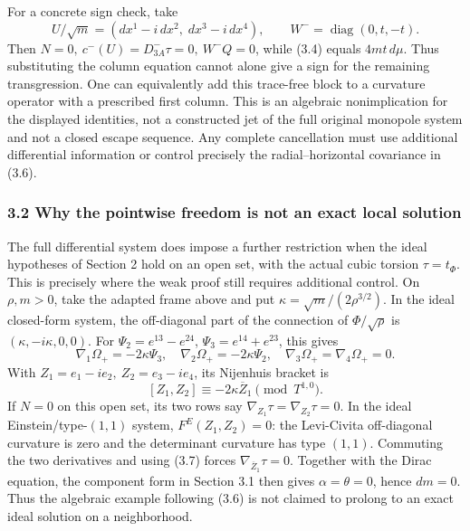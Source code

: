 \documentclass[
  10pt,
]{article}
\begin{document}
For a concrete sign check, take \[
 U/\sqrt m=(dx^1-i\,dx^2,\;dx^3-i\,dx^4),\qquad
 W^-=\operatorname{diag}(0,t,-t).
\] Then \(N=0,\ c^-(U)=D^-_{3A}\tau=0,\ W^-Q=0\), while (3.4) equals
\(4mt\,d\mu\). Thus substituting the column equation cannot alone give a
sign for the remaining transgression. One can equivalently add this
trace-free block to a curvature operator with a prescribed first column.
This is an algebraic nonimplication for the displayed identities, not a
constructed jet of the full original monopole system and not a closed
escape sequence. Any complete cancellation must use additional
differential information or control precisely the radial--horizontal
covariance in (3.6).

\hypertarget{why-the-pointwise-freedom-is-not-an-exact-local-solution}{%
\subsubsection{3.2 Why the pointwise freedom is not an exact local
solution}\label{why-the-pointwise-freedom-is-not-an-exact-local-solution}}

The full differential system does impose a further restriction when the
ideal hypotheses of Section 2 hold on an open set, with the actual cubic
torsion \(\tau=t_\Phi\). This is precisely where the weak proof still
requires additional control. On \(\rho,m>0\), take the adapted frame
above and put \(\kappa=\sqrt m/(2\rho^{3/2})\). In the ideal closed-form
system, the off-diagonal part of the connection of \(\Phi/\sqrt\rho\) is
\((\kappa,-i\kappa,0,0)\). For \(\Psi_2=e^{13}-e^{24}\),
\(\Psi_3=e^{14}+e^{23}\), this gives \[
 \nabla_1\Omega_+=-2\kappa\Psi_3,\quad
 \nabla_2\Omega_+=-2\kappa\Psi_2,\quad
 \nabla_3\Omega_+=\nabla_4\Omega_+=0.
\] With \(Z_1=e_1-ie_2,\ Z_2=e_3-ie_4\), its Nijenhuis bracket is \[
       [Z_1,Z_2]\equiv-2\kappa\overline Z_1
                                      \pmod{T^{1,0}}.          \tag{3.7}
\] If \(N=0\) on this open set, its two rows say
\(\nabla_{Z_1}\tau=\nabla_{Z_2}\tau=0\). In the ideal
Einstein/type-\((1,1)\) system, \(F^E(Z_1,Z_2)=0\): the Levi-Civita
off-diagonal curvature is zero and the determinant curvature has type
\((1,1)\). Commuting the two derivatives and using (3.7) forces
\(\nabla_{\overline Z_1}\tau=0\). Together with the Dirac equation, the
component form in Section 3.1 then gives \(\alpha=\theta=0\), hence
\(dm=0\). Thus the algebraic example following (3.6) is not claimed to
prolong to an exact ideal solution on a neighborhood.
\end{document}
